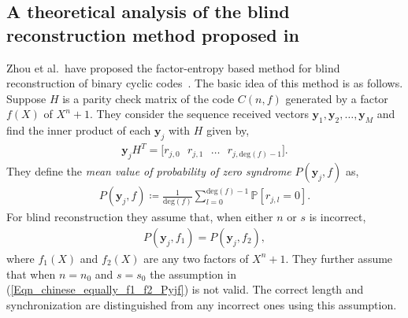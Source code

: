 \documentclass[10pt,journal]{IEEEtran}
\def \deg{{\mathrm{deg}}}
\begin{document}
\subsection{A theoretical analysis of the blind reconstruction method proposed in \cite{Zhou2013_Entropy_new}}

Zhou et al.~have proposed the factor-entropy based method for blind reconstruction of binary cyclic codes~\cite{Zhou2013_Entropy_new}.
The basic idea of this method is as follows.
Suppose $H$ is a parity check matrix of the code $C(n,f)$ generated by a factor $f(X)$ of $X^n+1$.
They consider the sequence received vectors $\mathbf{y}_1, \mathbf{y}_2, \ldots, \mathbf{y}_M$
and find the inner product of each $\mathbf{y}_j$ with $H$ given by,
% 
\begin{align}
%  
\mathbf{y}_j H^T = \Big[ r_{j,0} \mbox{~~} r_{j,1} \mbox{~~} \ldots \mbox{~~} r_{j,\deg(f)-1} \Big].
% 
\end{align}
% 
They define the \textit{mean value of probability of zero syndrome} $P(\mathbf{y}_j,f)$ as,
% 
\begin{align}
%  
P(\mathbf{y}_j,f) \coloneqq \frac{1}{\deg(f)} \sum_{l=0}^{\deg(f)-1} \mathbb{P}[r_{j,l} = 0].
\label{Eqn_chinese_Pjf_expression}
% 
\end{align}
% 
For blind reconstruction they assume that, when either $n$ or $s$ is incorrect, 
% 
\begin{align}
%  
P(\mathbf{y}_j,f_1) = P(\mathbf{y}_j,f_2),
\label{Eqn_chinese_equally_f1_f2_Pyjf}
% 
\end{align}
% 
where $f_1(X)$ and $f_2(X)$ are any two factors of $X^n+1$. They further assume that when $n = n_0$ and $s=s_0$
the assumption in (\ref{Eqn_chinese_equally_f1_f2_Pyjf}) is not valid.
% 
The correct length and synchronization are distinguished from any incorrect ones using this assumption.
% 
\end{document}
